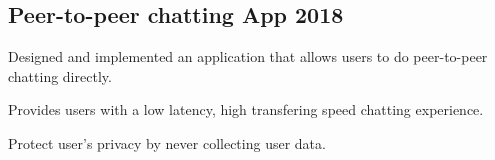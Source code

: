 \documentclass[letter,10pt]{article}
\begin{document}
\subsection{{Peer-to-peer chatting App \hfill 2018}}
\begin{zitemize}
    \item Designed and implemented an application that allows users to do peer-to-peer chatting directly.
    \item Provides users with a low latency, high transfering speed chatting experience.
    \item Protect user's privacy by never collecting user data.
\end{zitemize}
\end{document}
